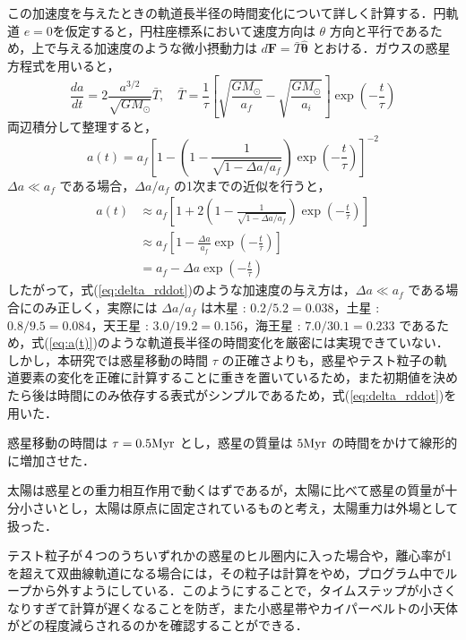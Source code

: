 \documentclass[11pt,a4paper,oneside,onecolumn]{jreport}
\begin{document}
この加速度を与えたときの軌道長半径の時間変化について詳しく計算する．円軌道 $e = 0$を仮定すると，円柱座標系において速度方向は $\theta$ 方向と平行であるため，上で与える加速度のような微小摂動力は $d {\bm F} = \bar{T} \hat{\bm \theta}$ とおける．ガウスの惑星方程式を用いると，
\begin{equation}
\frac{d a}{d t} = 2 \frac{a^{3/2}}{\sqrt{G M_{\odot}}} \bar{T}, \quad \bar{T} = \frac{1}{\tau} \left[ \sqrt{\frac{G M_{\odot}}{a_f}} - \sqrt{\frac{G M_{\odot}}{a_i}} \right] \exp \left(- \frac{t}{\tau} \right)
\end{equation}
両辺積分して整理すると，
\begin{equation}
a (t) = a_f \left[ 1 - \left( 1 - \frac{1}{\sqrt{1 - \Delta a/ a_f}} \right) \exp \left( - \frac{t}{\tau} \right) \right]^{-2} \label{eq:a(t)_new}
\end{equation}
$\Delta a \ll a_f$ である場合，$\Delta a/ a_f$ の1次までの近似を行うと，
\begin{equation}
\begin{split}
a (t) & \approx a_f \left[ 1 + 2 \left( 1 - \frac{1}{\sqrt{1 - \Delta a/ a_f}} \right) \exp \left( - \frac{t}{\tau} \right) \right] \\
& \approx a_f \left[ 1 - \frac{\Delta a}{a_f} \exp \left( - \frac{t}{\tau} \right) \right] \\
& = a_f - \Delta a \exp \left( - \frac{t}{\tau} \right)
\end{split}
\label{eq:a(t)_approx}
\end{equation}
したがって，式(\ref{eq:delta_rddot})のような加速度の与え方は，$\Delta a \ll a_f$ である場合にのみ正しく，実際には $\Delta a/ a_f$ は木星 : $0.2 / 5.2 = 0.038$，土星 : $0.8 / 9.5 = 0.084$，天王星 : $3.0 /19.2 = 0.156$，海王星 : $7.0 / 30.1 = 0.233$ であるため，式(\ref{eq:a(t)})のような軌道長半径の時間変化を厳密には実現できていない．しかし，本研究では惑星移動の時間 $\tau$ の正確さよりも，惑星やテスト粒子の軌道要素の変化を正確に計算することに重きを置いているため，また初期値を決めたら後は時間にのみ依存する表式がシンプルであるため，式(\ref{eq:delta_rddot})を用いた．

惑星移動の時間は $\tau = 0.5 {\rm Myr}$ とし，惑星の質量は $5 {\rm Myr}$ の時間をかけて線形的に増加させた\cite{Minton}．

太陽は惑星との重力相互作用で動くはずであるが，太陽に比べて惑星の質量が十分小さいとし，太陽は原点に固定されているものと考え，太陽重力は外場として扱った．

テスト粒子が４つのうちいずれかの惑星のヒル圏内に入った場合や，離心率が1を超えて双曲線軌道になる場合には，その粒子は計算をやめ，プログラム中でループから外すようにしている．このようにすることで，タイムステップが小さくなりすぎて計算が遅くなることを防ぎ，また小惑星帯やカイパーベルトの小天体がどの程度減らされるのかを確認することができる．
\end{document}
